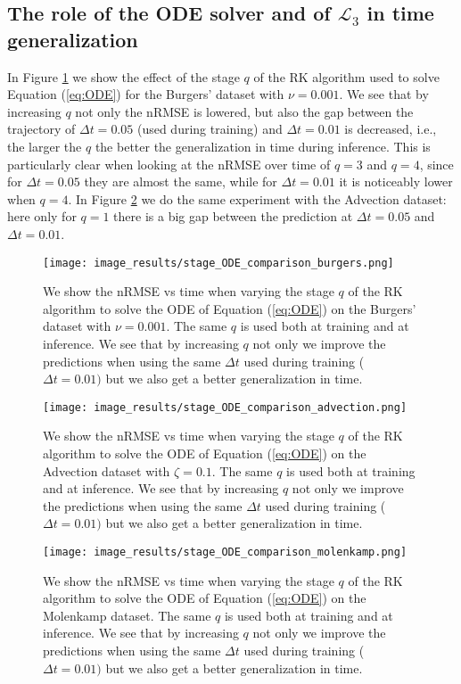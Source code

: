 \subsection{The role of the ODE solver and of $\mathcal{L}_3$ in time generalization}
\label{subsec:solver_for_time}
In Figure \ref{fig:ODE_comparison_burger} we show the effect of the stage $q$ of the RK algorithm used to solve Equation (\ref{eq:ODE}) for the Burgers' dataset with $\nu=0.001$. We see that by increasing $q$ not only the nRMSE is lowered, but also the gap between the trajectory of $\Delta t = 0.05$ (used during training)  and $\Delta t = 0.01$ is decreased, i.e., the larger the $q$ the better the generalization in time during inference. This is particularly clear when looking at the nRMSE over time of $q=3$ and $q=4$, since for $\Delta t =0.05$ they are almost the same, while for $\Delta t =0.01$ it is noticeably lower when $q=4$. In Figure \ref{fig:ODE_comparison_advection} we do the same experiment with the Advection dataset: here only for $q=1$ there is a big gap between the prediction at $\Delta t=0.05$ and $\Delta t=0.01$. 
\begin{figure}
  \centering
  \texttt{[image: image\_results/stage\_ODE\_comparison\_burgers.png]}
  \caption{We show the nRMSE vs time when varying the stage $q$ of the RK algorithm to solve the ODE of Equation (\ref{eq:ODE}) on the Burgers' dataset with $\nu=0.001$. The same $q$ is used both at training and at inference. We see that by increasing $q$ not only we improve the predictions when using the same $\Delta t$ used during training ($\Delta t = 0.01)$ but we also get a better generalization in time.} 
  \label{fig:ODE_comparison_burger}
\end{figure}
\begin{figure}
  \centering
  \texttt{[image: image\_results/stage\_ODE\_comparison\_advection.png]}
  \caption{We show the nRMSE vs time when varying the stage $q$ of the RK algorithm to solve the ODE of Equation (\ref{eq:ODE}) on the Advection dataset with $\zeta=0.1$. The same $q$ is used both at training and at inference. We see that by increasing $q$ not only we improve the predictions when using the same $\Delta t$ used during training ($\Delta t = 0.01)$ but we also get a better generalization in time.} 
  \label{fig:ODE_comparison_advection}
\end{figure}

\begin{figure}
  \centering
  \texttt{[image: image\_results/stage\_ODE\_comparison\_molenkamp.png]}
  \caption{We show the nRMSE vs time when varying the stage $q$ of the RK algorithm to solve the ODE of Equation (\ref{eq:ODE}) on the Molenkamp dataset. The same $q$ is used both at training and at inference. We see that by increasing $q$ not only we improve the predictions when using the same $\Delta t$ used during training ($\Delta t = 0.01)$ but we also get a better generalization in time.} 
  \label{fig:ODE_comparison_molenkamp}
\end{figure}

